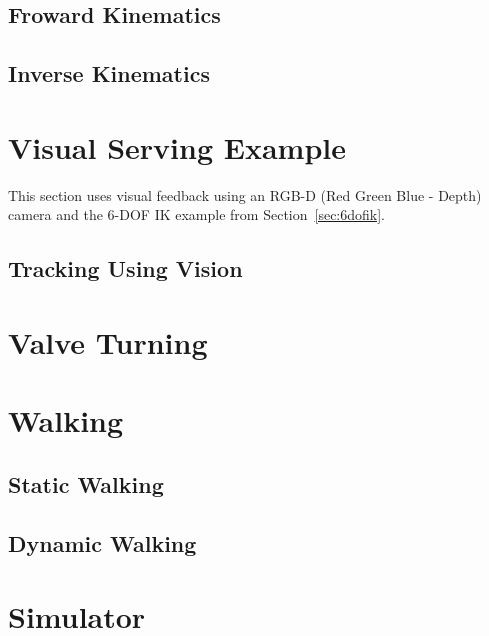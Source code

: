 	\subsection{Froward Kinematics} 
		
	\subsection{Inverse Kinematics}
			
			
\section{Visual Serving Example}
This section uses visual feedback using an RGB-D (Red Green Blue - Depth) camera and the 6-DOF IK example from Section~\ref{sec:6dofik}.
	\subsection{Tracking Using Vision}
		
		
		
\section{Valve Turning}
	

\section{Walking}
	
	\subsection{Static Walking}\label{sec:staticWalking}
		
	\subsection{Dynamic Walking}\label{sec:dynamicWalking}
		














\section{Simulator}\label{sec:simulator}
	


